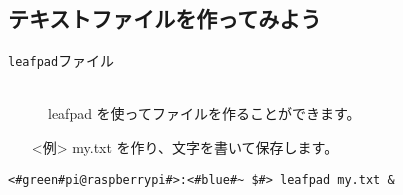\subsection{テキストファイルを作ってみよう}
\begin{description}
\item[\texttt{leafpad}\textvisiblespace ファイル]\mbox{}\\
leafpad を使ってファイルを作ることができます。
\end{description}
\begin{itemize}
\item[<例>]my.txt を作り、文字を書いて保存します。
\end{itemize}
\begin{lstlisting}[caption=leafpadの例, label=leafpad]
<#green#pi@raspberrypi#>:<#blue#~ $#> leafpad my.txt &
\end{lstlisting}
\begin{tcolorbox}[title=\useOmetoi]
\begin{enumerate}
\end{enumerate}
\end{tcolorbox}
